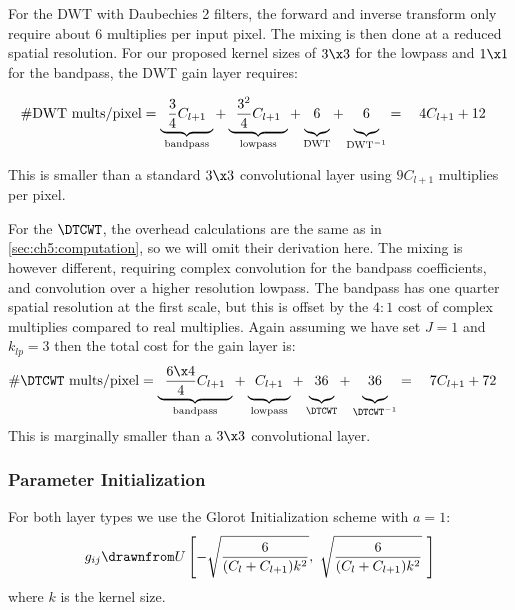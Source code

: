 For the DWT with Daubechies 2 filters, the forward and inverse transform only
require about $6$ multiplies per input pixel. The mixing is then done at a
reduced spatial resolution. For our proposed kernel sizes of $3\x 3$ for the
lowpass and $1\x 1$ for the bandpass, the DWT gain layer requires:

\begin{equation}
  \text{\#DWT mults/pixel} = \underbrace{\hphantom{1} \frac{3}{4}C_{l+1} \hphantom{1}}_{\textrm{bandpass}} +
  \underbrace{\hphantom{1}\vphantom{\frac{3}{4}} \frac{3^2}{4} C_{l+1} \hphantom{1}}_{\textrm{lowpass}} + 
  \underbrace{\vphantom{\frac{3}{4}} 6}_{\text{DWT}} + 
  \underbrace{\vphantom{\frac{3}{4}} 6}_{\text{DWT}^{-1}} = \quad 4C_{l+1} + 12 \quad
  \label{eq:ch6:comp_dwt}
\end{equation}

This is smaller than a standard $3\x 3$ convolutional layer using $9C_{l+1}$
multiplies per pixel.

For the $\DTCWT$, the overhead calculations are the same as in
\autoref{sec:ch5:computation}, so we will omit their derivation here. The mixing
is however different, requiring complex convolution for the bandpass
coefficients, and convolution over a higher resolution lowpass. The bandpass has
one quarter spatial resolution at the first scale, but this is offset by the
$4:1$ cost of complex multiplies compared to real multiplies. Again assuming we
have set $J=1$ and $k_{lp} = 3$ then the total cost for the gain layer is:
%
\begin{equation}
  \text{\#$\DTCWT$ mults/pixel} = \underbrace{\hphantom{1} \frac{6\x 4}{4}C_{l+1} \hphantom{1}}_{\textrm{bandpass}} +
  \underbrace{\hphantom{1}\vphantom{\frac{6}{4}} C_{l+1} \hphantom{1}}_{\textrm{lowpass}} + 
  \underbrace{\vphantom{\frac{6}{4}} 36}_{\DTCWT} + 
  \underbrace{\vphantom{\frac{6}{4}} 36}_{\DTCWT^{-1}} = \quad 7C_{l+1} + 72 \quad
  \label{eq:ch6:comp_dtcwt}
\end{equation}
This is marginally smaller than a $3\x 3$ convolutional layer.

\subsubsection{Parameter Initialization}
For both layer types we use the Glorot Initialization scheme \cite{glorot_understanding_2010}
with $a=1$: 
%
\begin{equation}
  g_{ij} \drawnfrom U\left[ -\sqrt{\frac{6}{(C_l + C_{l+1})k^2}},\ \sqrt{\frac{6}{(C_l + C_{l+1})k^2}}\
  \right] \label{eq:ch6:glorot}
\end{equation}
where $k$ is the kernel size.
% 
